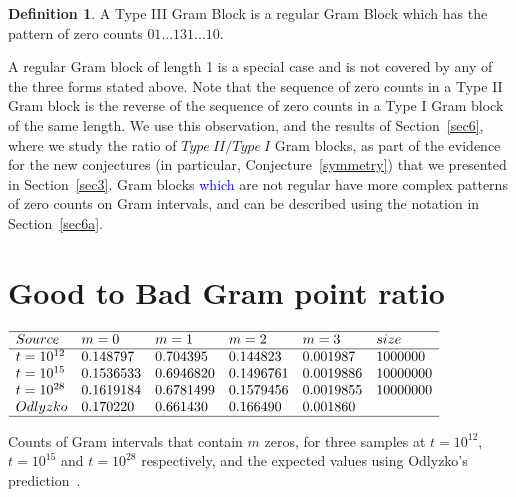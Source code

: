 \documentclass[twoside]{article}
\theoremstyle{definition}
\newtheorem{defn}{Definition}
\begin{document}
\begin{defn}\label{gramblockIII}
A Type III Gram Block is a regular Gram Block which has the pattern of zero counts $01 . . . 131 . . . 10$.
\end{defn}
A regular Gram block of length 1 is a special case and is not covered by any of the three forms stated above. Note that the sequence of zero counts in a Type II Gram block is the reverse of the sequence of zero counts in a Type I Gram block of the same length. We use this observation, and the results of Section~\ref{sec6}, where we study the ratio of $Type~II/Type~I$ Gram blocks, as part of the evidence for the new conjectures (in particular,  Conjecture~\ref{symmetry}) that we presented in Section~\ref{sec3}. Gram blocks \textcolor{blue}{which} are not regular have more complex patterns of zero counts on Gram intervals, and can be described using the notation in Section~\ref{sec6a}.

\section{\label{sec5}Good to Bad Gram point ratio}

\begin{table}
\centering \(\begin{array}{llllll}
\hline
Source &m = 0&m = 1&m = 2&m = 3&size\\
\hline
t = 10^{12}&0.148797&0.704395&0.144823&0.001987&1000000\\
t = 10^{15}&0.1536533&0.6946820&0.1496761&0.0019886&10000000\\
t = 10^{28}&0.1619184&0.6781499&0.1579456&0.0019855&10000000\\
Odlyzko&0.170220&0.661430&0.166490&0.001860&\\
\hline
\end{array}\)
\caption{Counts of Gram intervals that contain $m$ zeros, for three samples at $t=10^{12}$, $t=10^{15}$  and $t=10^{28}$ respectively, and the  expected values using Odlyzko's prediction~\cite{Odlyzko 1992}.} \label{tab:intervalzeros}
\end{table}
\end{document}
